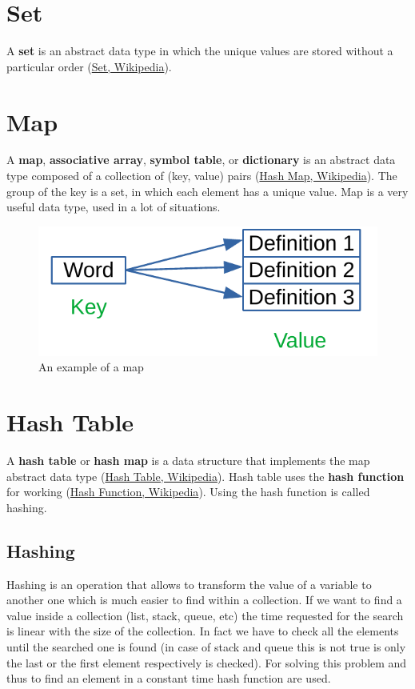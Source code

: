 \section{Set}
A \textbf{set} is an abstract data type in which the unique values are stored without a particular order \cite{wikiset} (\href{https://en.wikipedia.org/wiki/Set_(abstract_data_type)}{Set, Wikipedia}).

\section{Map}
A \textbf{map}, \textbf{associative array}, \textbf{symbol table}, or \textbf{dictionary} is an abstract data type composed of a collection of (key, value) pairs \cite{wikihashmap} (\href{https://en.wikipedia.org/wiki/Associative_array}{Hash Map, Wikipedia}). The group of the key is a set, in which each element has a unique value. Map is a very useful data type, used in a lot of situations. 

\begin{figure}[H]
	\begin{center}
		\includegraphics[scale=.6]{chapters/datastructures/images/map_1.pdf}
		\caption[An example of a map]{An example of a map}
		\label{map_1}
	\end{center}
\end{figure}

\section{Hash Table}
A \textbf{hash table} or \textbf{hash map} is a data structure that implements the map abstract data type \cite{wikihashtable} (\href{https://en.wikipedia.org/wiki/Hash_table}{Hash Table, Wikipedia}). Hash table uses the \textbf{hash function} for working \cite{wikihashfunction} (\href{https://en.wikipedia.org/wiki/Hash_function}{Hash Function, Wikipedia}). Using the hash function is called hashing.

\subsection{Hashing}
Hashing is an operation that allows to transform the value of a variable to another one which is much easier to find within a collection. If we want to find a value inside a collection (list, stack, queue, etc) the time requested for the search is linear with the size of the collection. In fact we have to check all the elements until the searched one is found (in case of stack and queue this is not true is only the last or the first element respectively is checked). For solving this problem and thus to find an element in a constant time hash function are used. 

